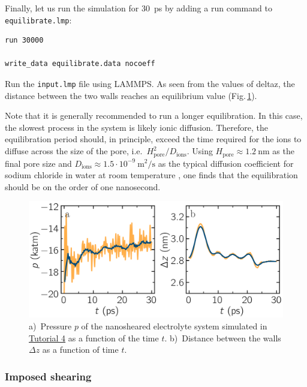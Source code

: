 \documentclass[9pt,tutorial]{livecoms}
\newcommand{\lmpcmd}[1]{\hspace{0pt}\colorbox{listing}{\textcolor{command}{\small{#1}}}\hspace{0pt}} %
\newcommand{\flecmd}[1]{\textcolor{command}{\texttt{#1}}} %
\begin{document}
Finally, let us run the simulation for 30~ps by adding a \lmpcmd{run} command
to \flecmd{equilibrate.lmp}:
\begin{lstlisting}
run 30000

write_data equilibrate.data nocoeff
\end{lstlisting}
Run the \flecmd{input.lmp} file using LAMMPS.  As seen from the values of
\lmpcmd{deltaz}, the distance between the two walls reaches
an equilibrium value (Fig.\,\ref{fig:NANOSHEAR-equilibration}).

\begin{note}
Note that it is generally recommended to run a longer equilibration.  In this case,
the slowest process in the system is likely ionic diffusion.
Therefore, the equilibration period should, in principle, exceed the time required
for the ions to diffuse across the size of the pore, i.e.~$H_\text{pore}^2/D_\text{ions}$.
Using $H_\text{pore} \approx 1.2~\text{nm}$ as the final pore size
and $D_\text{ions} \approx 1.5 \cdot 10^{-9}~\text{m}^2/\text{s}$
as the typical diffusion coefficient for sodium chloride in water at room
temperature \cite{mills1955remeasurement}, one finds that the equilibration
should be on the order of one nanosecond.
\end{note}

\begin{figure}
\centering
\includegraphics[width=\linewidth]{NANOSHEAR-equilibration}
\caption{a)~Pressure $p$ of the nanosheared electrolyte system
simulated in \hyperref[sheared-confined-label]{Tutorial 4} as a function of the
time $t$. b)~Distance between the walls $\Delta z$ as a function of time $t$.}
\label{fig:NANOSHEAR-equilibration}
\end{figure}

\subsubsection{Imposed shearing}
\end{document}
